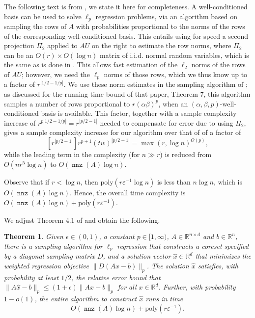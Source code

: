 \documentclass{sig-alternate}
\DeclareMathOperator{\nnz}{\mathtt{nnz}}
\newcommand{\poly}{{\mathrm{poly}}}
\newcommand{\eps}{\varepsilon}
\newcommand{\R}{{\mathbb R}}
\newtheorem{theorem}{Theorem}
\begin{document}
The following text is from \cite{CDMMMW}, we state it here for completeness. 
A well-conditioned basis can be used 
to solve $\ell_p$ regression problems, via an algorithm based on sampling the rows
of $A$ with probabilities proportional to the norms of the rows of the corresponding
well-conditioned basis. This entails
using for speed a second projection $\Pi_2$ applied to $AU$ on the right
to estimate the row norms, where $\Pi_2$ can be an $O(r) \times O(\log n)$ matrix of 
i.i.d. normal random variables, which is the same as is done in \cite{dmmw11}. 
This allows fast estimation of the $\ell_2$ norms of the rows of $AU$;
however, we need the $\ell_p$ norms of those rows, which we thus know up
to a factor of $r^{|1/2 - 1/p|}$.
We use these norm estimates
in the sampling algorithm of \cite{ddhkm09}; as discussed for
the running time bound of that paper, Theorem 7, this algorithm samples
a number of rows proportional to $r(\alpha\beta)^p$,
when an $(\alpha, \beta, p)$-well-conditioned
basis is available. This factor, together with
a sample complexity increase of $r^{p|1/2-1/p|} = r^{|p/2-1|}$ needed to compensate
for error due to using $\Pi_2$, gives a sample complexity increase for our algorithm
over that of \cite{ddhkm09} of a factor
of
\[
[r^{|p/2 - 1|}]r^{p+1}(tw)^{|p/2 - 1|} = \max(r, \log n)^{O(p)},
\]
while the leading term in the complexity (for $n\gg r$)
is reduced from $O(nr^5\log n)$ to $O(\nnz(A)\log n)$. 

Observe that if $r < \log n$,
then $\poly(r \eps^{-1} \log n)$ is less than $n \log n$, which is $O(\nnz(A) \log n)$. 
Hence, the overall time complexity is $O(\nnz(A) \log n) + \poly(r \eps^{-1})$. 

We adjust Theorem 4.1 of \cite{ddhkm09} 
and obtain the following.
\fi 

\begin{theorem}\label{thm:lp-running}
Given $\epsilon\in(0,1)$, a constant $p \in [1, \infty)$, 
$A\in\R^{n\times d}$ and $b\in\R^{n}$,
there is a sampling algorithm for $\ell_p$ regression that
constructs a coreset specified by a diagonal sampling matrix $D$, and 
a solution vector $\hat{x} \in \R^d$ that minimizes the weighted regression objective
$\|D(Ax-b)\|_p$.  The solution $\hat{x}$ satisfies, with probability
at least $1/2$, the relative error bound that
$\|A \hat{x}-b\|_p\le (1+\epsilon)\|Ax-b\|_p$
for all $x\in\R^d$.
Further, with probability
$1-o(1)$, the entire algorithm to construct $\hat{x}$  runs in time
$$O\left(\nnz(A)\log n \right ) + \poly(r \eps^{-1}).$$
\end{theorem}
\end{document}
